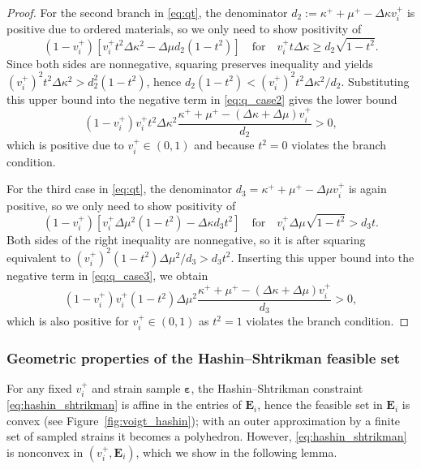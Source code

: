 \documentclass[preprint,3p]{elsarticle}
\newcommand{\tenss}[1]{\bm{\mathbf{#1}}}            %
\newcommand{\tensf}[1]{\bm{\mathbf{#1}}}            %
\newcommand{\strain}{\tenss{\varepsilon}}           %
\newcommand{\Ei}{\tensf{E}_i}                       %
\begin{document}
\begin{proof}
    For the second branch in \eqref{eq:qt}, the denominator $d_2 := \kappa^+ + \mu^+ - \Delta \kappa v_i^+$ is positive due to ordered materials, so we only need to show positivity of
    \begin{equation}\label{eq:q_case2}
        (1-v_i^+)\left[v_i^+ t^2 \Delta \kappa^2 - \Delta\mu d_2 (1-t^2)\right] \quad \text{for}\quad  v_i^+ t \Delta\kappa \ge d_2 \sqrt{1-t^2}.
    \end{equation}
    Since both sides are nonnegative, squaring preserves inequality and yields $(v_i^+)^2 t^2\Delta\kappa^2 > d_2^2 (1-t^2)$, hence $d_2 (1-t^2) < (v_i^+)^2 t^2\Delta\kappa^2/d_2$. Substituting this upper bound into the negative term in \eqref{eq:q_case2} gives the lower bound
    \begin{equation}\label{eq:q_case2_final}
        (1-v_i^+) v_i^+ {t}^2\Delta \kappa^2 \frac{\kappa^+ + \mu^+ - (\Delta\kappa + \Delta\mu)v_i^+}{d_2} > 0,
    \end{equation}
    which is positive due to $v_i^+ \in (0,1)$ and because $t^2 = 0$ violates the branch condition.

    For the third case in \eqref{eq:qt}, the denominator $d_3 = \kappa^{+} + \mu^{+} - \Delta \mu v_i^+$ is again positive, so we only need to show positivity of
    \begin{equation}\label{eq:q_case3}
        (1-v_i^+) \left[ v_i^+ \Delta \mu^2 (1-t^2) - \Delta\kappa d_3 t^2 \right] \quad \text{for} \quad v_i^+ \Delta \mu \sqrt{1-t^2} > d_3 t.
    \end{equation}
    Both sides of the right inequality are nonnegative, so it is after squaring equivalent to $(v_i^+)^2 (1-t^2) \Delta\mu^2/d_3 > d_3 t^2$. Inserting this upper bound into the negative term in \eqref{eq:q_case3}, we obtain
    \begin{equation}\label{eq:q_case3_final}
        (1-v_i^+){v_i^+}(1-t^2) \Delta\mu^2 \frac{\kappa^+ + \mu^+ - (\Delta\kappa + \Delta\mu)v_i^+}{d_3} > 0,
    \end{equation}
    which is also positive for $v_i^+ \in (0,1)$ as $t^2 = 1$ violates the branch condition.
\end{proof}

\subsubsection{Geometric properties of the Hashin--Shtrikman feasible set}

For any fixed $v_i^+$ and strain sample $\strain$, the Hashin--Shtrikman constraint \eqref{eq:hashin_shtrikman} is affine in the entries of $\Ei$, hence the feasible set in $\Ei$ is convex (see Figure~\ref{fig:voigt_hashin}); with an outer approximation by a finite set of sampled strains it becomes a polyhedron. However, \eqref{eq:hashin_shtrikman} is nonconvex in $(v_i^+, \Ei)$, which we show in the following lemma.
\end{document}
